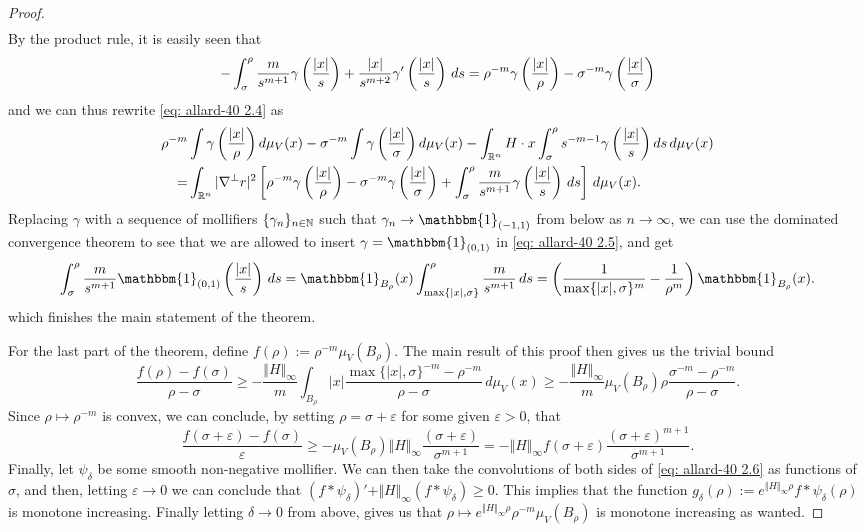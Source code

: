 \begin{proof}
\begin{align}
\end{align}
By the product rule, it is easily seen that
\[
    -\int_{\sigma}^{\rho} \frac{m}{s^{m+1}} \gamma\left(\frac{|x|}{s}\right) + \frac{|x|}{s^{m+2}} \gamma'\left(\frac{|x|}{s}\right)\, ds = \rho^{-m} \gamma\left(\frac{|x|}{\rho}\right) - \sigma^{-m} \gamma\left(\frac{|x|}{\sigma}\right)
\]
and we can thus rewrite \eqref{eq: allard-40 2.4} as
\begin{align}
    \rho^{-m} &\int \gamma\left(\frac{|x|}{\rho}\right) d\mu_V(x) - \sigma^{-m} \int \gamma\left(\frac{|x|}{\sigma}\right) d\mu_V(x) - \int_{\mathbb{R}^n} H \cdot x \int_{\sigma}^{\rho} s^{-m-1} \gamma\left(\frac{|x|}{s}\right)ds\,d\mu_V(x)\nonumber \\
    =& \int_{\mathbb{R}^n} |\nabla^{\perp}r|^2 \left[ \rho^{-m} \gamma\left(\frac{|x|}{\rho}\right) - \sigma^{-m} \gamma\left(\frac{|x|}{\sigma}\right) + \int_{\sigma}^{\rho} \frac{m}{s^{m+1}}\gamma\left(\frac{|x|}{s}\right) \, ds \right] \,d\mu_V(x).\label{eq: allard-40 2.5}
\end{align}
Replacing $\gamma$ with a sequence of mollifiers $\{\gamma_n\}_{n \in \mathbb{N}}$ such that $\gamma_n \to \mathbbm{1}_{(-1,1)}$ from below as $n \to \infty$, we can use the dominated convergence theorem to see that we are allowed to insert $\gamma = \mathbbm{1}_{(0,1)}$ in \eqref{eq: allard-40 2.5}, and get
\[
    \int_{\sigma}^{\rho} \frac{m}{s^{m+1}} \mathbbm{1}_{(0,1)}\paren{\frac{|x|}{s}}\, ds = \mathbbm{1}_{B_{\rho}}(x) \int_{\max\{|x|,\sigma\}}^{\rho} \frac{m}{s^{m+1}}\, ds = \paren{\frac{1}{\max\{|x|,\sigma\}^m } - \frac{1}{\rho^m} } \mathbbm{1}_{ B_{\rho} }(x).
\]
which finishes the main statement of the theorem.

For the last part of the theorem, define $f(\rho) := \rho^{-m} \mu_V(B_{\rho})$. The main result of this proof then gives us the trivial bound
\[
    \frac{f(\rho) - f(\sigma)}{\rho - \sigma} \ge - \frac{\Vert H \Vert_{\infty} }{m} \int_{B_{\rho}} |x| \frac{\max\{|x|,\sigma\}^{-m} - \rho^{-m} }{\rho - \sigma}\, d\mu_V(x) \ge -\frac{\Vert H \Vert_{\infty} }{m} \mu_V(B_{\rho}) \rho \frac{\sigma^{-m} - \rho^{-m} }{\rho - \sigma}.
\]
Since $\rho \mapsto \rho^{-m}$ is convex, we can conclude, by setting $\rho = \sigma + \varepsilon$ for some given $\varepsilon > 0$, that
\begin{equation}
    \frac{f(\sigma + \varepsilon) - f(\sigma)}{\varepsilon} \ge - \mu_V(B_{\rho}) \Vert H \Vert_{\infty} \frac{(\sigma + \varepsilon)}{\sigma^{m+1}} = - \Vert H \Vert_{\infty} f(\sigma + \varepsilon)\frac{(\sigma + \varepsilon)^{m+1} }{\sigma^{m+1} }.\label{eq: allard-40 2.6}
\end{equation}
Finally, let $\psi_{\delta}$ be some smooth non-negative mollifier. We can then take the convolutions of both sides of \eqref{eq: allard-40 2.6} as functions of $\sigma$, and then, letting $\varepsilon \to 0$ we can conclude that $(f * \psi_{\delta})' + \Vert H \Vert_{\infty}(f*\psi_{\delta}) \ge 0$. This implies that the function $g_{\delta}(\rho) := e^{\Vert H \Vert_{\infty}\rho} f * \psi_{\delta}(\rho)$ is monotone increasing. Finally letting $\delta \to 0$ from above, gives us that $\rho \mapsto e^{\Vert H \Vert_{\infty}\rho}\rho^{-m}\mu_V(B_{\rho})$ is monotone increasing as wanted.
\end{proof}

